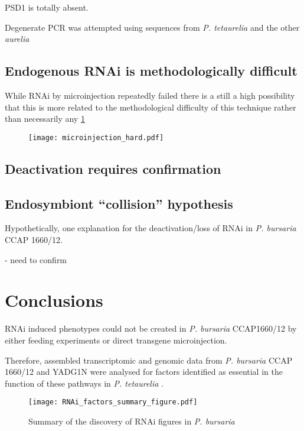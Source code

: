PSD1 is totally absent. 

Degenerate PCR was attempted using sequences from \textit{P. tetaurelia} and 
the other \textit{aurelia}




\subsection{Endogenous RNAi is methodologically difficult}


While RNAi by microinjection repeatedly failed there is a still a high possibility
that this is more related to the methodological difficulty of this technique rather than
necessarily any 
\cref{fig:microinjection_nucleus}

\begin{figure}
    \texttt{[image: microinjection\_hard.pdf]}
    \caption{}
    \label{fig:microinjection_nucleus}
\end{figure}


\subsection{Deactivation requires confirmation}




\subsection{Endosymbiont ``collision'' hypothesis}

Hypothetically, one explanation for the deactivation/loss
of RNAi in \textit{P. bursaria} CCAP 1660/12.

- need to confirm 




\section{Conclusions}

RNAi induced phenotypes could not be created in \textit{P. bursaria} CCAP1660/12
by either feeding experiments or direct transgene microinjection. 

Therefore, assembled transcriptomic and genomic data from \textit{P. bursaria}
CCAP 1660/12 and YADG1N were analysed for factors identified as essential in the function
of these pathways in \textit{P. tetaurelia} \citep{Marker2014}. 

\begin{figure}
    \texttt{[image: RNAi\_factors\_summary\_figure.pdf]}
    \caption[Summary of RNAi Factors Presence]{Summary of the discovery
    of RNAi figures in \textit{P. bursaria}}
    \label{fig:rnai_summary}
\end{figure}

